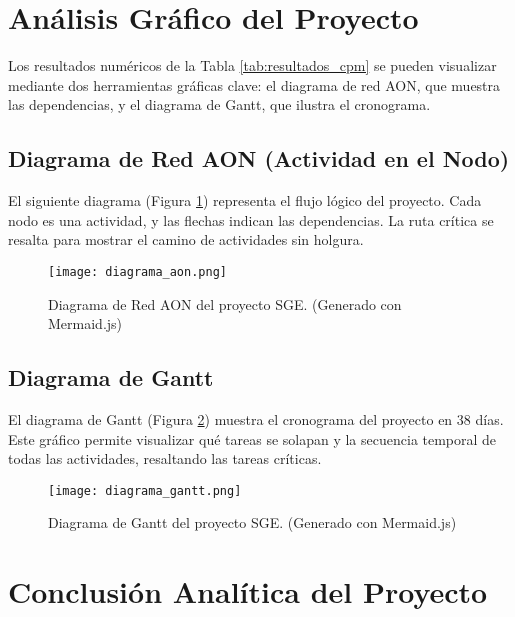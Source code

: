 \documentclass[a4paper,9pt]{article}
\begin{document}
\section*{Análisis Gráfico del Proyecto}
Los resultados numéricos de la Tabla \ref{tab:resultados_cpm} se pueden visualizar mediante dos herramientas gráficas clave: el diagrama de red AON, que muestra las dependencias, y el diagrama de Gantt, que ilustra el cronograma.

\subsection*{Diagrama de Red AON (Actividad en el Nodo)}

El siguiente diagrama (Figura \ref{fig:aon_diagram}) representa el flujo lógico del proyecto. Cada nodo es una actividad, y las flechas indican las dependencias. La ruta crítica se resalta para mostrar el camino de actividades sin holgura.

\begin{figure}[h!]
\centering
\texttt{[image: diagrama\_aon.png]}
\caption{Diagrama de Red AON del proyecto SGE. (Generado con Mermaid.js)}
\label{fig:aon_diagram}
\end{figure}


\subsection*{Diagrama de Gantt}

El diagrama de Gantt (Figura \ref{fig:gantt_chart}) muestra el cronograma del proyecto en 38 días. Este gráfico permite visualizar qué tareas se solapan y la secuencia temporal de todas las actividades, resaltando las tareas críticas.

\begin{figure}[h!]
\centering
\texttt{[image: diagrama\_gantt.png]}
\caption{Diagrama de Gantt del proyecto SGE. (Generado con Mermaid.js)}
\label{fig:gantt_chart}
\end{figure}

\clearpage %



\section*{Conclusión Analítica del Proyecto}
\end{document}
